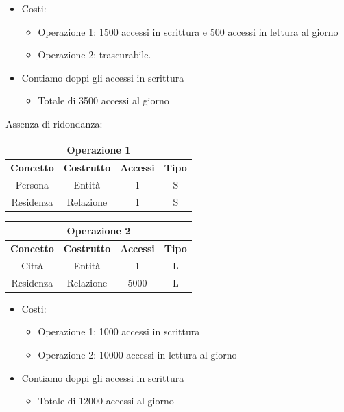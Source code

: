 \documentclass[../main.tex]{subfiles}
\begin{document}
	\begin{itemize}
		\item Costi:
		\begin{itemize}
			\item Operazione 1: 1500 accessi in scrittura e 500 accessi in lettura al giorno
			\item Operazione 2: trascurabile.
		\end{itemize}
		\item Contiamo doppi gli accessi in scrittura
		\begin{itemize}
			\item Totale di 3500 accessi al giorno
		\end{itemize}
	\end{itemize}
	Assenza di ridondanza:
	\begin{center}
		\begin{tabular}{ |c|c|c|c| }
			\hline
			\multicolumn{4}{|c|}{Operazione 1}\\
			\hline
			\textbf{Concetto} & \textbf{Costrutto} & \textbf{Accessi} & \textbf{Tipo}\\
			\hline
			Persona & Entità & 1 & S\\
			Residenza & Relazione & 1 & S\\
			\hline
		\end{tabular}
		\begin{tabular}{ |c|c|c|c| }
			\hline
			\multicolumn{4}{|c|}{Operazione 2}\\
			\hline
			\textbf{Concetto} & \textbf{Costrutto} & \textbf{Accessi} & \textbf{Tipo}\\
			\hline
			Città & Entità & 1 & L\\
			Residenza & Relazione & 5000 & L\\
			\hline
		\end{tabular}
	\end{center}
	\begin{itemize}
		\item Costi:
		\begin{itemize}
			\item Operazione 1: 1000 accessi in scrittura
			\item Operazione 2: 10000 accessi in lettura al giorno
		\end{itemize}
		\item Contiamo doppi gli accessi in scrittura
		\begin{itemize}
			\item Totale di 12000 accessi al giorno
		\end{itemize}
	\end{itemize}
\end{document}
